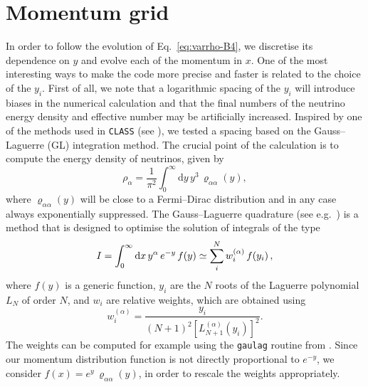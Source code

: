 \documentclass[notitlepage,nofootinbib,showpacs,preprintnumbers,amsmath,amssymb,superscriptaddress,prd,onecolumn]{revtex4-1}
\begin{document}
\section{Momentum grid}
\label{ssec:momenta}
In order to follow the evolution of Eq.~\eqref{eq:varrho-B4}, we discretise its dependence on $y$ and evolve each of the momentum in $x$.
One of the most interesting ways to make the code more precise and faster is related to the choice of the $y_i$.
First of all, we note that a logarithmic spacing of the $y_i$
will introduce biases in the numerical calculation
and that the final numbers of
the neutrino energy density and effective number may be artificially increased.
Inspired by one of the methods used in \texttt{CLASS} (see \cite{Lesgourgues:2011rh}),
we tested a spacing based on the Gauss--Laguerre (GL) integration method.
The crucial point of the calculation is to compute the energy density of neutrinos,
given by
%
\begin{equation}
\rho_\alpha
=
\frac{1}{\pi^2}
\int_0^\infty
\mathrm{d}y\, y^3\,\varrho_{\alpha\alpha}(y),
\end{equation}
%
where $\varrho_{\alpha\alpha}(y)$ will be close to a Fermi--Dirac distribution and in any case always exponentially suppressed.
The Gauss--Laguerre quadrature (see e.g.~\cite{NR})
is a method that is designed to optimise the solution of integrals of the type
\begin{equation}
I
=
\int_0^\infty
{\rm d}x\, y^\alpha\,e^{-y}\,f(y)
\simeq\sum_i^{N}w_i^{(\alpha)}\,f(y_i)
\,,
\end{equation}
where $f(y)$ is a generic function,
$y_i$ are the $N$ roots of the Laguerre polynomial $L_N$ of order $N$, and $w_i$ are relative weights,
which are obtained using
\begin{equation}
w_i^{(\alpha)}=
\frac{y_i}{\left(N+1\right)^2\left[L^{(\alpha)}_{N+1}(y_i)\right]^2}.
\end{equation}
The weights can be computed for example using the \texttt{gaulag} routine from \cite{NR}.
Since our momentum distribution function is not directly proportional to $e^{-y}$,
we consider $f(x)=e^y\,\varrho_{\alpha\alpha}(y)$,
in order to rescale the weights appropriately.
\end{document}
